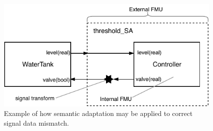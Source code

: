 \begin{figure}[bt]
\centering
\includegraphics[width=0.8\columnwidth]{Images/watertank_SA.pdf}
\caption{Example of how semantic adaptation may be applied to correct signal data mismatch.}
\label{fig:watertank_SA}
\end{figure}
